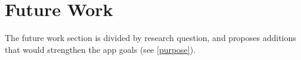 \chapter{Future Work}\label{cha:future-work}


The future work section is divided by research question, and proposes additions that would strengthen the app goals (see \ref{purpose}).






